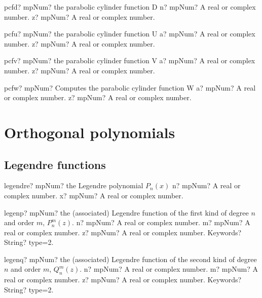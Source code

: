 \documentclass[12pt,a4paper,openany]{book}
\begin{document}
\begin{mpFunctionsExtract}
\mpFunctionTwo
{pcfd? mpNum? the parabolic cylinder function D}
{n? mpNum? A real or complex number.}
{z? mpNum? A real or complex number.}
\end{mpFunctionsExtract}

\begin{mpFunctionsExtract}
\mpFunctionTwo
{pcfu? mpNum? the parabolic cylinder function U}
{a? mpNum? A real or complex number.}
{z? mpNum? A real or complex number.}
\end{mpFunctionsExtract}

\begin{mpFunctionsExtract}
\mpFunctionTwo
{pcfv? mpNum? the parabolic cylinder function V}
{a? mpNum? A real or complex number.}
{z? mpNum? A real or complex number.}
\end{mpFunctionsExtract}

\begin{mpFunctionsExtract}
\mpFunctionTwo
{pcfw? mpNum? Computes the parabolic cylinder function W}
{a? mpNum? A real or complex number.}
{z? mpNum? A real or complex number.}
\end{mpFunctionsExtract}

\chapter{Orthogonal polynomials}

\section{Legendre functions}

\begin{mpFunctionsExtract}
\mpFunctionTwo
{legendre? mpNum? the Legendre polynomial $P_n(x)$}
{n? mpNum? A real or complex number.}
{x? mpNum? A real or complex number.}
\end{mpFunctionsExtract}

\begin{mpFunctionsExtract}
\mpFunctionFour
{legenp? mpNum? the (associated) Legendre function of the first kind of degree $n$ and order $m$, $P_n^m(z)$.}
{n? mpNum? A real or complex number.}
{m? mpNum? A real or complex number.}
{z? mpNum? A real or complex number.}
{Keywords? String? type=2.}
\end{mpFunctionsExtract}

\begin{mpFunctionsExtract}
\mpFunctionFour
{legenq? mpNum? the (associated) Legendre function of the second kind of degree $n$ and order $m$, $Q_n^m(z)$.}
{n? mpNum? A real or complex number.}
{m? mpNum? A real or complex number.}
{z? mpNum? A real or complex number.}
{Keywords? String? type=2.}
\end{mpFunctionsExtract}
\end{document}
